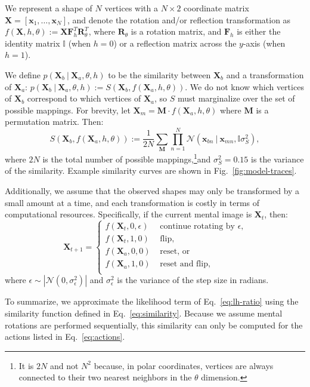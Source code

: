 \documentclass[10pt,letterpaper]{article}
\newcommand{\Xa}[0]{\mathbf{X}_a}
\newcommand{\Xb}[0]{\mathbf{X}_b}
\newcommand{\Xt}[0]{\mathbf{X}_t}
\newcommand{\R}[0]{\mathbf{R}_\theta}
\newcommand{\F}[0]{\mathbf{F}}
\newcommand{\M}[0]{\mathbf{M}}
\newcommand{\I}[0]{\mathbb{I}}
\newcommand{\hi}[0]{h=0}
\newcommand{\hf}[0]{h=1}
\begin{document}
We represent a shape of $N$ vertices with a $N\times 2$ coordinate
matrix $\mathbf{X}=[\mathbf{x}_1, \ldots{}, \mathbf{x}_N]$, and denote
the rotation and/or reflection transformation as $f(\mathbf{X}, h,
\theta):=\mathbf{X}\F_h^T\R^T$, where $\R$ is a rotation matrix, and
$\F_h$ is either the identity matrix $\I$ (when $\hi$) or a reflection
matrix across the $y$-axis (when $\hf$).

We define $p(\Xb\ \vert\ \Xa, \theta, h)$ to be the similarity between
$\Xb$ and a transformation of $\Xa$: $p(\Xb\ \vert\ \Xa, \theta, h):=
S(\Xb, f(\Xa, h, \theta))$.  We do not know which vertices of $\Xb$
correspond to which vertices of $\Xa$, so $S$ must marginalize over
the set of possible mappings. For brevity, let
$\mathbf{X}_m=\M\cdot{}f(\Xa, h, \theta)$ where $\M$ is a permutation
matrix. Then:
\begin{equation}
  S(\Xb, f(\Xa, h, \theta)):=\frac{1}{2N} \sum_{\M} \prod_{n=1}^N \mathcal{N}(\mathbf{x}_{bn}\ \vert \ \mathbf{x}_{mn}, \I\sigma_S^2),
  \label{eq:similarity}
\end{equation}
where $2N$ is the total number of possible mappings,\footnote{It is
  $2N$ and not $N^2$ because, in polar coordinates, vertices are
  always connected to their two nearest neighbors in the $\theta$
  dimension.}and $\sigma_S^2=0.15$ is the variance of the
similarity. Example similarity curves are shown in
Fig.~\ref{fig:model-traces}.

Additionally, we assume that the observed shapes may only be
transformed by a small amount at a time, and each transformation is
costly in terms of computational resources. Specifically, if the
current mental image is $\Xt$, then:
\begin{equation}
  \mathbf{X}_{t+1} = \left\{ \begin{array}{ll}
      f(\Xt, 0, \epsilon) &\mbox{ continue rotating by $\epsilon$,} \\
      f(\Xt, 1, 0) &\mbox{ flip,} \\
      f(\Xa, 0, 0) &\mbox{ reset, or} \\
      f(\Xa, 1, 0) &\mbox{ reset and flip,} \\
    \end{array} \right.
  \label{eq:actions}
\end{equation}
where $\epsilon\sim \left|\mathcal{N}(0, \sigma_\epsilon^2)\right|$
and $\sigma_\epsilon^2$ is the variance of the step size in radians.

To summarize, we approximate the likelihood term of
Eq.~\ref{eq:lh-ratio} using the similarity function defined in
Eq.~\ref{eq:similarity}. Because we assume mental rotations are
performed sequentially, this similarity can only be computed for the
actions listed in Eq.~\ref{eq:actions}.
\end{document}
